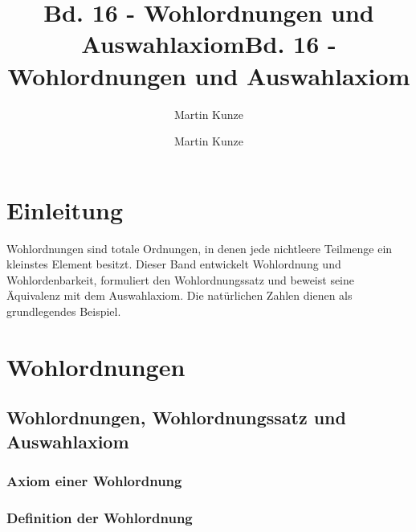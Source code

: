 \documentclass[main.tex]{subfiles}
\title{Bd. 16 - Wohlordnungen und Auswahlaxiom}
\author{Martin Kunze}
\date{}
\begin{document}
\title{Bd. 16 - Wohlordnungen und Auswahlaxiom}
\author{Martin Kunze}
\date{}
\hypersetup{pageanchor=false}
\maketitle
\hypersetup{pageanchor=true}
\setcounter{tocdepth}{3}
\tableofcontents
\setcounter{file}{16}
\renewcommand{\FormulaBandID}{16}
\chapter{Einleitung}

Wohlordnungen sind totale Ordnungen, in denen jede nichtleere Teilmenge ein
kleinstes Element besitzt. Dieser Band entwickelt Wohlordnung und
Wohlordenbarkeit, formuliert den Wohlordnungssatz und beweist seine Äquivalenz
mit dem Auswahlaxiom. Die natürlichen Zahlen dienen als grundlegendes Beispiel.

\chapter{Wohlordnungen}
\section{Wohlordnungen, Wohlordnungssatz und Auswahlaxiom}
\subsection{Axiom einer Wohlordnung}


\subsection{Definition der Wohlordnung}

\end{document}
